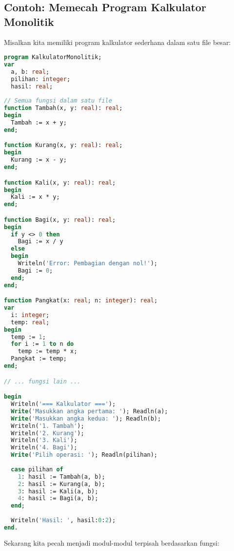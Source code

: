 \documentclass[../main.tex]{subfiles}
\begin{document}
\subsection{Contoh: Memecah Program Kalkulator Monolitik}

Misalkan kita memiliki program kalkulator sederhana dalam satu file besar:

\begin{lstlisting}[language=Pascal, caption={Program monolitik (kalkulator\_monolitik.pas)}]
program KalkulatorMonolitik;
var
  a, b: real;
  pilihan: integer;
  hasil: real;
  
// Semua fungsi dalam satu file
function Tambah(x, y: real): real;
begin
  Tambah := x + y;
end;

function Kurang(x, y: real): real;
begin
  Kurang := x - y;
end;

function Kali(x, y: real): real;
begin
  Kali := x * y;
end;

function Bagi(x, y: real): real;
begin
  if y <> 0 then
    Bagi := x / y
  else
  begin
    Writeln('Error: Pembagian dengan nol!');
    Bagi := 0;
  end;
end;

function Pangkat(x: real; n: integer): real;
var
  i: integer;
  temp: real;
begin
  temp := 1;
  for i := 1 to n do
    temp := temp * x;
  Pangkat := temp;
end;

// ... fungsi lain ...

begin
  Writeln('=== Kalkulator ===');
  Write('Masukkan angka pertama: '); Readln(a);
  Write('Masukkan angka kedua: '); Readln(b);
  Writeln('1. Tambah');
  Writeln('2. Kurang');
  Writeln('3. Kali');
  Writeln('4. Bagi');
  Write('Pilih operasi: '); Readln(pilihan);
  
  case pilihan of
    1: hasil := Tambah(a, b);
    2: hasil := Kurang(a, b);
    3: hasil := Kali(a, b);
    4: hasil := Bagi(a, b);
  end;
  
  Writeln('Hasil: ', hasil:0:2);
end.
\end{lstlisting}

Sekarang kita pecah menjadi modul-modul terpisah berdasarkan fungsi:
\end{document}
